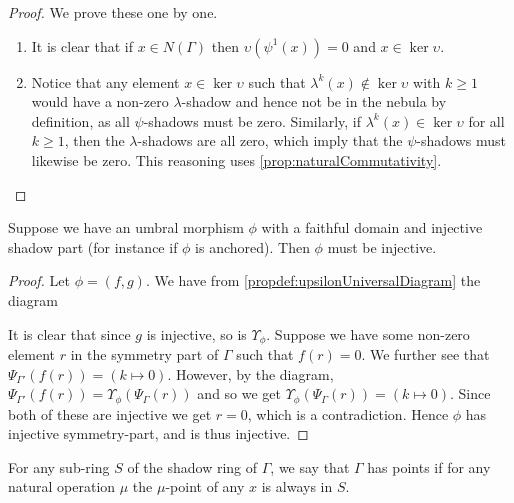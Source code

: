 \begin{proof}
  We prove these one by one.
  \begin{enumerate}
    \item It is clear that if $x \in N(\Gamma)$ then $\upsilon(\psi^1(x)) = 0$ and $x \in \ker \upsilon$.
    \item Notice that any element $x \in \ker \upsilon$ such that $\lambda^k(x) \notin \ker \upsilon$ with $k \ge 1$ would have a non-zero $\lambda$-shadow and hence not be in the nebula by definition, as all $\psi$-shadows must be zero. Similarly, if $\lambda^k(x) \in \ker \upsilon$ for all $k \ge 1$, then the $\lambda$-shadows are all zero, which imply that the $\psi$-shadows must likewise be zero. This reasoning  uses \ref{prop:naturalCommutativity}.
  \end{enumerate}
\end{proof}

\begin{proposition}
  Suppose we have an umbral morphism $\phi$ with a faithful domain and injective shadow part (for instance if $\phi$ is anchored). Then $\phi$ must be injective. 
\end{proposition}

\begin{proof}
  Let $\phi = (f, g)$. We have from \ref{propdef:upsilonUniversalDiagram} the diagram
  \begin{center}
  \end{center}
  It is clear that since $g$ is injective, so is $\Upsilon_{\phi}$. Suppose we have some non-zero element $r$ in the symmetry part of $\Gamma$ such that $f(r) = 0$. We further see that $\Psi_{\Gamma'}(f(r)) = (k \mapsto 0)$. However, by the diagram, $\Psi_{\Gamma'}(f(r)) = \Upsilon_\phi(\Psi_{\Gamma}(r))$ and so we get $\Upsilon_\phi(\Psi_{\Gamma}(r)) = (k \mapsto 0)$. Since both of these are injective we get $r = 0$, which is a contradiction. Hence $\phi$ has injective symmetry-part, and is thus injective. \qedhere
\end{proof}

\begin{definition}
  For any sub-ring $S$ of the shadow ring of $\Gamma$, we say that $\Gamma$ has points if for any natural operation $\mu$ the $\mu$-point of any $x$ is always in $S$.
\end{definition}


